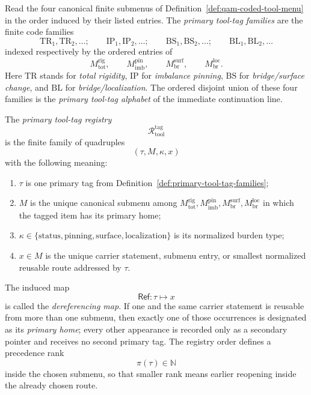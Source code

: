 \begin{definition}
\label{def:primary-tool-tag-families}
Read the four canonical finite submenus of Definition~\ref{def:qam-coded-tool-menu} in the order induced by their listed entries. The \emph{primary tool-tag families} are the finite code families
\[
\mathrm{TR}_1,\mathrm{TR}_2,\dots;\qquad
\mathrm{IP}_1,\mathrm{IP}_2,\dots;\qquad
\mathrm{BS}_1,\mathrm{BS}_2,\dots;\qquad
\mathrm{BL}_1,\mathrm{BL}_2,\dots
\]
indexed respectively by the ordered entries of
\[
M^{\mathrm{rig}}_{\mathrm{tot}},\qquad
M^{\mathrm{pin}}_{\mathrm{imb}},\qquad
M^{\mathrm{surf}}_{\mathrm{br}},\qquad
M^{\mathrm{loc}}_{\mathrm{br}}.
\]
Here \(\mathrm{TR}\) stands for \emph{total rigidity}, \(\mathrm{IP}\) for \emph{imbalance pinning}, \(\mathrm{BS}\) for \emph{bridge/surface change}, and \(\mathrm{BL}\) for \emph{bridge/localization}. The ordered disjoint union of these four families is the \emph{primary tool-tag alphabet} of the immediate continuation line.
\end{definition}

\begin{definition}
\label{def:primary-tool-tag-registry-dereferencing-map}
The \emph{primary tool-tag registry}
\[
\mathcal R^{\mathrm{tag}}_{\mathrm{tool}}
\]
is the finite family of quadruples
\[
(\tau,M,\kappa,x)
\]
with the following meaning:
\begin{enumerate}[leftmargin=2em]
  \item \(\tau\) is one primary tag from Definition~\ref{def:primary-tool-tag-families};
  \item \(M\) is the unique canonical submenu among \(M^{\mathrm{rig}}_{\mathrm{tot}}, M^{\mathrm{pin}}_{\mathrm{imb}}, M^{\mathrm{surf}}_{\mathrm{br}}, M^{\mathrm{loc}}_{\mathrm{br}}\) in which the tagged item has its primary home;
  \item \(\kappa\in\{\mathrm{status},\mathrm{pinning},\mathrm{surface},\mathrm{localization}\}\) is its normalized burden type;
  \item \(x\in M\) is the unique carrier statement, submenu entry, or smallest normalized reusable route addressed by \(\tau\).
\end{enumerate}
The induced map
\[
\mathsf{Ref}:\tau\longmapsto x
\]
is called the \emph{dereferencing map}. If one and the same carrier statement is reusable from more than one submenu, then exactly one of those occurrences is designated as its \emph{primary home}; every other appearance is recorded only as a secondary pointer and receives no second primary tag. The registry order defines a precedence rank
\[
\pi(\tau)\in\mathbb N
\]
inside the chosen submenu, so that smaller rank means earlier reopening inside the already chosen route.
\end{definition}

